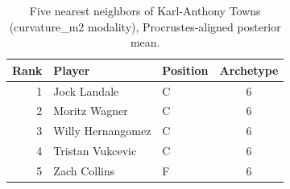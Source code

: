\begin{table}[htbp]
  \centering\small
  \begin{tabular}{rllc}
    \toprule
    Rank & Player & Position & Archetype \\
    \midrule
    1 & Jock Landale & C & 6 \\
    2 & Moritz Wagner & C & 6 \\
    3 & Willy Hernangomez & C & 6 \\
    4 & Tristan Vukcevic & C & 6 \\
    5 & Zach Collins & F & 6 \\
    \bottomrule
  \end{tabular}
  \caption{Five nearest neighbors of Karl-Anthony Towns (curvature_m2 modality), Procrustes-aligned posterior mean.}
  \label{tab:Karl_Anthony_Towns_neighbors_curvature_m2}
\end{table}

